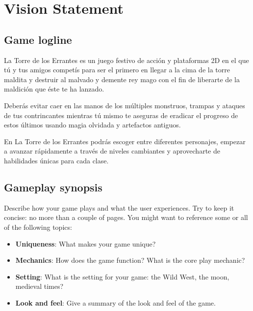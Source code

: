 \chapter{Vision Statement}

\section{Game logline}%
La Torre de los Errantes es un juego festivo de acción y plataformas 2D en el que tú y tus amigos competís
para ser el primero en llegar a la cima de la torre maldita y destruir al malvado y demente rey mago con
el fin de liberarte de la maldición que éste te ha lanzado.

Deberás evitar caer en las manos de los múltiples monstruos, trampas y ataques de tus contrincantes
mientras tú mismo te aseguras de eradicar el progreso de estos últimos usando magia olvidada y artefactos
antiguos.

En La Torre de los Errantes podrás escoger entre diferentes personajes, empezar a avanzar rápidamente
a través de niveles cambiantes y aprovecharte de habilidades únicas para cada clase.

\section{Gameplay synopsis}%
Describe how your game plays and what the user experiences. Try to keep it concise: no more than a couple of pages. You might want to reference some or all of the following topics:
\begin{itemize}
    \item \textbf{Uniqueness}: What makes your game unique?
    \item \textbf{Mechanics}: How does the game function? What is the core play mechanic?
    \item \textbf{Setting}: What is the setting for your game: the Wild West, the moon, medieval times?
    \item \textbf{Look and feel}: Give a summary of the look and feel of the game.
\end{itemize}

